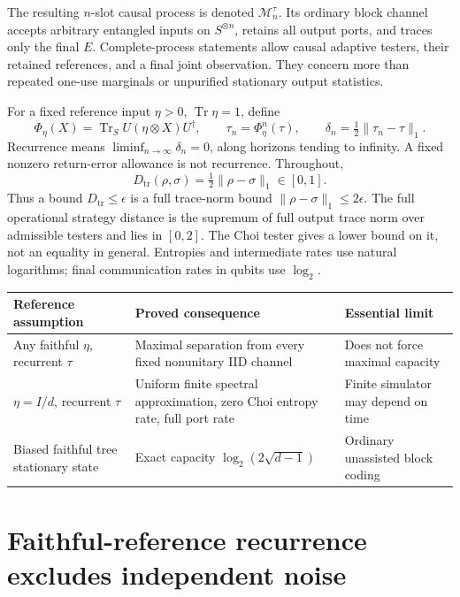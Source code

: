 \documentclass[11pt]{article}
\theoremstyle{definition}\newtheorem{definition}[theorem]{Definition}
\newcommand{\Tr}{\operatorname{Tr}}
\newcommand{\cM}{\mathcal M}
\newcommand{\norm}[1]{\lVert #1\rVert}
\newcommand{\D}{D_{\mathrm{tr}}}
\begin{document}
The resulting $n$-slot causal process is denoted $\cM_n^\tau$. Its ordinary block channel accepts arbitrary entangled inputs on $S^{\otimes n}$, retains all output ports, and traces only the final $E$. Complete-process statements allow causal adaptive testers, their retained references, and a final joint observation. They concern more than repeated one-use marginals or unpurified stationary output statistics.

For a fixed reference input $\eta>0$, $\Tr\eta=1$, define
\begin{equation}
 \Phi_\eta(X)=\Tr_S U(\eta\otimes X)U^\dagger,
 \qquad \tau_n=\Phi_\eta^n(\tau),
 \qquad \delta_n=\tfrac12\norm{\tau_n-\tau}_1.
 \label{eq:orbit}
\end{equation}
Recurrence means $\liminf_{n\to\infty}\delta_n=0$, along horizons tending to infinity. A fixed nonzero return-error allowance is not recurrence. Throughout,
\[
 \D(\rho,\sigma)=\tfrac12\norm{\rho-\sigma}_1\in[0,1].
\]
Thus a bound $\D\le\epsilon$ is a full trace-norm bound $\norm{\rho-\sigma}_1\le2\epsilon$. The full operational strategy distance is the supremum of full output trace norm over admissible testers and lies in $[0,2]$. The Choi tester gives a lower bound on it, not an equality in general. Entropies and intermediate rates use natural logarithms; final communication rates in qubits use $\log_2$.

\begin{center}
\begin{tabularx}{\textwidth}{@{}lXX@{}}\toprule
Reference assumption & Proved consequence & Essential limit\\\midrule
Any faithful $\eta$, recurrent $\tau$ & Maximal separation from every fixed nonunitary IID channel & Does not force maximal capacity\\
$\eta=I/d$, recurrent $\tau$ & Uniform finite spectral approximation, zero Choi entropy rate, full port rate & Finite simulator may depend on time\\
Biased faithful tree stationary state & Exact capacity $\log_2(2\sqrt{d-1})$ & Ordinary unassisted block coding\\\bottomrule
\end{tabularx}
\end{center}

\section{Faithful-reference recurrence excludes independent noise}
\end{document}
